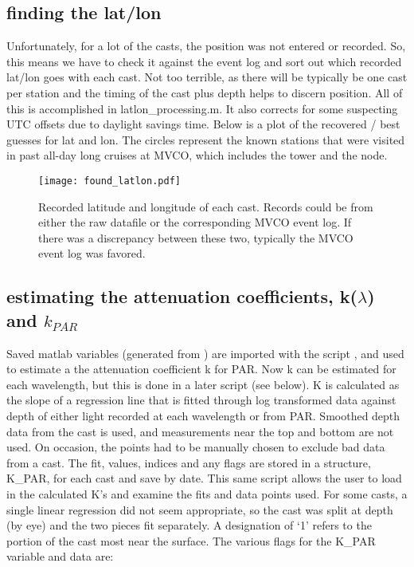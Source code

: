 \documentclass[11pt]{article}
\begin{document}
\subsection{finding the lat/lon}

Unfortunately, for a lot of the casts, the position was not entered or recorded. So, this means we have to check it against the event log and sort out which recorded lat/lon goes with each cast. Not too terrible, as there will be typically be one cast per station and the timing of the cast plus depth helps to discern position. All of this is accomplished in latlon\_processing.m. It also corrects for some suspecting UTC offsets due to daylight savings time.
Below is a plot of the recovered / best guesses for lat and lon. The circles represent the known stations that were visited in past all-day long cruises at MVCO, which includes the tower and the node.

 \begin{figure}[h]
\centering
\texttt{[image: found\_latlon.pdf]}
\caption{Recorded latitude and longitude of each cast. Records could be from either the raw datafile or the corresponding MVCO event log. If there was a discrepancy between these two, typically the MVCO event log was favored.}
\end{figure}

\clearpage

\subsection{estimating the attenuation coefficients, k($\lambda$) and $k_{PAR}$}

Saved matlab variables (generated from ) are imported with the script , and used to estimate a the attenuation coefficient k for PAR. Now k can be estimated for each wavelength, but this is done in a later script (see below). K is calculated as the slope of a regression line that is fitted through log transformed data against depth of either light recorded at each wavelength or from PAR.  Smoothed depth data from the cast is used, and measurements near the top and bottom are not used. On occasion, the points had to be manually chosen to exclude bad data from a cast. The fit, values, indices and any flags are stored in a structure, K\_PAR, for each cast and save by date. This same script allows the user to load in the calculated K's and examine the fits and data points used. For some casts, a single linear regression did not seem appropriate, so the cast was split at depth (by eye) and the two pieces fit separately. A designation of `1' refers to the portion of the cast most near the surface. The various flags for the K\_PAR variable and data are:
\end{document}
